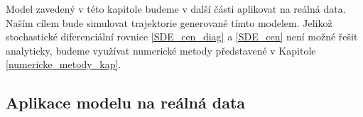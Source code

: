 \documentclass[a4paper,12pt]{report}
\theoremstyle{definition} \newtheorem{definice}[veta]{Definice}
\theoremstyle{remark}
\begin{document}
%

Model zavedený v této kapitole budeme v další části aplikovat na reálná data.
Naším cílem bude simulovat trajektorie generované tímto modelem.
Jelikož stochastické diferenciální rovnice \eqref{SDE_cen_diag} a \eqref{SDE_cen} není možné řešit analyticky, budeme využívat numerické metody představené v Kapitole \ref{numericke_metody_kap}.


\subsection{Aplikace modelu na reálná data}\label{aplikace}
\end{document}
